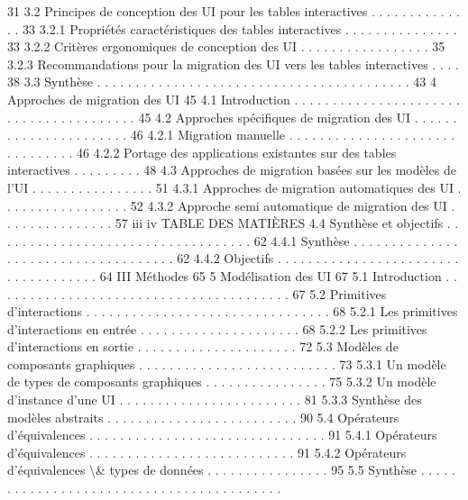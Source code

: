 \documentclass{article}
\begin{document}
31
3.2
Principes de conception des UI pour les tables interactives
. . . . . . . . . . . . . .
33
3.2.1
Propri\'{e}t\'{e}s caract\'{e}ristiques des tables interactives . . . . . . . . . . . . . . .
33
3.2.2
Crit\`{e}res ergonomiques de conception des UI
. . . . . . . . . . . . . . . . .
35
3.2.3
Recommandations pour la migration des UI vers les tables interactives . . . .
38
3.3
Synth\`{e}se . . . . . . . . . . . . . . . . . . . . . . . . . . . . . . . . . . . . . . . . .
43
4
Approches de migration des UI
45
4.1
Introduction . . . . . . . . . . . . . . . . . . . . . . . . . . . . . . . . . . . . . . .
45
4.2
Approches sp\'{e}ciﬁques de migration des UI
. . . . . . . . . . . . . . . . . . . . . .
46
4.2.1
Migration manuelle . . . . . . . . . . . . . . . . . . . . . . . . . . . . . . .
46
4.2.2
Portage des applications existantes sur des tables interactives . . . . . . . . .
48
4.3
Approches de migration bas\'{e}es sur les mod\`{e}les de l’UI . . . . . . . . . . . . . . . .
51
4.3.1
Approches de migration automatiques des UI . . . . . . . . . . . . . . . . .
52
4.3.2
Approche semi automatique de migration des UI . . . . . . . . . . . . . . .
57
iii
iv
TABLE DES MATIÈRES
4.4
Synth\`{e}se et objectifs
. . . . . . . . . . . . . . . . . . . . . . . . . . . . . . . . . .
62
4.4.1
Synth\`{e}se
. . . . . . . . . . . . . . . . . . . . . . . . . . . . . . . . . . . .
62
4.4.2
Objectifs
. . . . . . . . . . . . . . . . . . . . . . . . . . . . . . . . . . . .
64
III
M\'{e}thodes
65
5
Mod\'{e}lisation des UI
67
5.1
Introduction . . . . . . . . . . . . . . . . . . . . . . . . . . . . . . . . . . . . . . .
67
5.2
Primitives d’interactions
. . . . . . . . . . . . . . . . . . . . . . . . . . . . . . . .
68
5.2.1
Les primitives d’interactions en entr\'{e}e . . . . . . . . . . . . . . . . . . . . .
68
5.2.2
Les primitives d’interactions en sortie . . . . . . . . . . . . . . . . . . . . .
72
5.3
Mod\`{e}les de composants graphiques
. . . . . . . . . . . . . . . . . . . . . . . . . .
73
5.3.1
Un mod\`{e}le de types de composants graphiques . . . . . . . . . . . . . . . .
75
5.3.2
Un mod\`{e}le d’instance d’une UI
. . . . . . . . . . . . . . . . . . . . . . . .
81
5.3.3
Synth\`{e}se des mod\`{e}les abstraits . . . . . . . . . . . . . . . . . . . . . . . . .
90
5.4
Op\'{e}rateurs d’\'{e}quivalences
. . . . . . . . . . . . . . . . . . . . . . . . . . . . . . .
91
5.4.1
Op\'{e}rateurs d’\'{e}quivalences . . . . . . . . . . . . . . . . . . . . . . . . . . .
91
5.4.2
Op\'{e}rateurs d’\'{e}quivalences \textbackslash{}& types de donn\'{e}es
. . . . . . . . . . . . . . . .
95
5.5
Synth\`{e}se . . . . . . . . . . . . . . . . . . . . . . . . . . . . . . . . . . . . . . . . .
\end{document}

